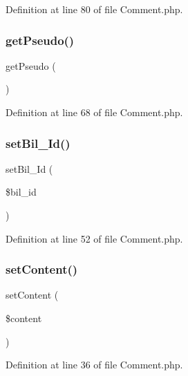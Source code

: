 Definition at line 80 of file Comment.\+php.

\mbox{\label{class_src_1_1_entity_1_1_comment_a7151e41f7b522d26d02102d970e9a309}} 
\subsubsection{get\+Pseudo()}
{\footnotesize\ttfamily get\+Pseudo (\begin{DoxyParamCaption}{ }\end{DoxyParamCaption})}



Definition at line 68 of file Comment.\+php.

\mbox{\label{class_src_1_1_entity_1_1_comment_a2e409e601842718df8e3fb392a6553a2}} 
\subsubsection{set\+Bil\+\_\+\+Id()}
{\footnotesize\ttfamily set\+Bil\+\_\+\+Id (\begin{DoxyParamCaption}\item[{}]{\$bil\+\_\+id }\end{DoxyParamCaption})}



Definition at line 52 of file Comment.\+php.

\mbox{\label{class_src_1_1_entity_1_1_comment_a04a5eddb7c3abc7bf31fa25b58f046bf}} 
\subsubsection{set\+Content()}
{\footnotesize\ttfamily set\+Content (\begin{DoxyParamCaption}\item[{}]{\$content }\end{DoxyParamCaption})}



Definition at line 36 of file Comment.\+php.

